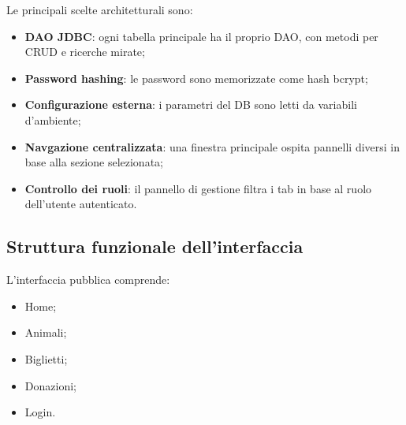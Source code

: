 \documentclass[12pt,a4paper]{report}
\begin{document}
Le principali scelte architetturali sono:
\begin{itemize}[itemsep=2pt]
    \item \textbf{DAO JDBC}: ogni tabella principale ha il proprio DAO, con metodi per CRUD e ricerche mirate;
    \item \textbf{Password hashing}: le password sono memorizzate come hash bcrypt;
    \item \textbf{Configurazione esterna}: i parametri del DB sono letti da variabili d'ambiente;
    \item \textbf{Navgazione centralizzata}: una finestra principale ospita pannelli diversi in base alla sezione selezionata;
    \item \textbf{Controllo dei ruoli}: il pannello di gestione filtra i tab in base al ruolo dell'utente autenticato.
\end{itemize}

\subsection*{Struttura funzionale dell'interfaccia}

L'interfaccia pubblica comprende:
\begin{itemize}[itemsep=2pt]
    \item Home;
    \item Animali;
    \item Biglietti;
    \item Donazioni;
    \item Login.
\end{itemize}
\end{document}
